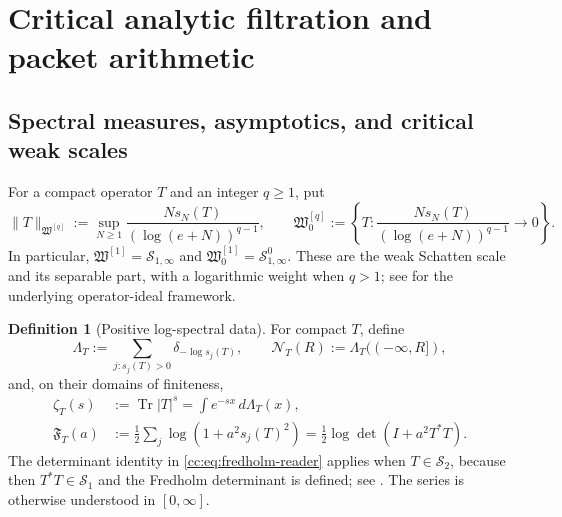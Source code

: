 \documentclass[10pt,reqno]{amsart}
\theoremstyle{plain}
\theoremstyle{definition}
\newtheorem{definition}[theorem]{Definition}
\theoremstyle{remark}
\begin{document}
\section{Critical analytic filtration and packet arithmetic}
\label{cr:sec-analytic}

\subsection{Spectral measures, asymptotics, and critical weak scales}
\label{cc:subsec:atom-rig}

For a compact operator \(T\) and an integer \(q\geq1\), put
\begin{equation}
 \|T\|_{\mathfrak W^{[q]}}
 :=\sup_{N\geq1}
 \frac{N s_N(T)}{(\log(e+N))^{q-1}},
 \qquad
 \mathfrak W^{[q]}_0
 :=\left\{T:\frac{Ns_N(T)}{(\log(e+N))^{q-1}}\to0\right\}.
 \label{cc:eq:critical-ideals}
\end{equation}
In particular,
\(\mathfrak W^{[1]}=\mathcal S_{1,\infty}\) and
\(\mathfrak W^{[1]}_0=\mathcal S^0_{1,\infty}\).
These are the weak Schatten scale and its separable part, with a logarithmic
weight when \(q>1\); see
\cite{Pietsch80,LordSukochevZanin12} for the underlying operator-ideal
framework.

\begin{definition}[Positive log-spectral data]
\label{cc:def:log-spectral-rig}
For compact \(T\), define
\begin{equation}
 \Lambda_T:=\sum_{j:s_j(T)>0}\delta_{-\log s_j(T)},
 \qquad
 \mathcal N_T(R):=\Lambda_T(({-}\infty,R]),
 \label{cc:eq:log-measure-counting}
\end{equation}
and, on their domains of finiteness,
\begin{align}
 \zeta_T(s)&:=\operatorname{Tr}|T|^s
 =\int e^{-sx}\,d\Lambda_T(x),                                
 \label{cc:eq:zeta-reader}\\
 \mathfrak F_T(a)&:=\frac12\sum_j\log(1+a^2s_j(T)^2)
 =\frac12\log\det(I+a^2T^*T).
 \label{cc:eq:fredholm-reader}
\end{align}
The determinant identity in \eqref{cc:eq:fredholm-reader} applies when
\(T\in\mathcal S_2\), because then \(T^*T\in\mathcal S_1\) and the
Fredholm determinant is defined; see \cite{Simon05}.  The series is otherwise understood in
\([0,\infty]\).
\end{definition}
\end{document}
